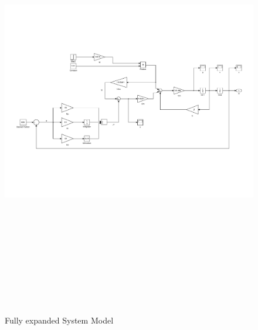 \documentclass{article}
\begin{document}
{\begin{figure}[h]
\setcounter{page}{8}
\includegraphics[height = 19cm]{DemoModelPID.pdf}
\caption{Fully expanded System Model}
\end{figure}
\pagebreak
}
\end{document}

